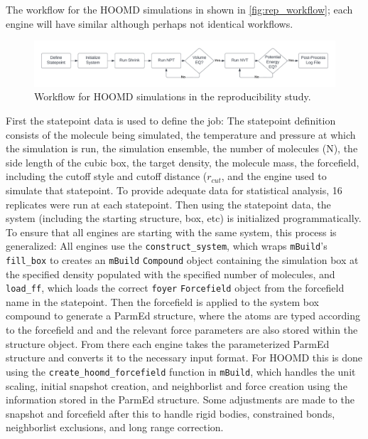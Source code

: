 The workflow for the HOOMD simulations in shown in \autoref{fig:rep_workflow}; each engine will have similar although perhaps not identical workflows.
\begin{figure}[h!]
    \centering
    \includegraphics[width=\linewidth,keepaspectratio]{figures/rep_study/reproducibility_workflow.png}
    \caption{Workflow for HOOMD simulations in the reproducibility study.}\label{fig:rep_workflow}
\end{figure}
First the statepoint data is used to define the job: The statepoint definition consists of the molecule being simulated, the temperature and pressure at which the simulation is run, the simulation ensemble, the number of molecules (N), the side length of the cubic box, the target density, the molecule mass, the forcefield, including the cutoff style and cutoff distance ($r_{cut}$, and the engine used to simulate that statepoint. 
To provide adequate data for statistical analysis, 16 replicates were run at each statepoint.
Then using the statepoint data, the system (including the starting structure, box, etc) is initialized programmatically.
To ensure that all engines are starting with the same system, this process is generalized: All engines use the \lstinline{construct_system}, which wraps \texttt{mBuild}'s \lstinline{fill_box} to creates an \texttt{mBuild} \lstinline{Compound} object containing the simulation box at the specified density populated with the specified number of molecules, and \lstinline{load_ff}, which loads the correct \texttt{foyer} \lstinline{Forcefield} object from the forcefield name in the statepoint. 
Then the forcefield is applied to the system box compound to generate a ParmEd structure\cite{Shirts2017}, where the atoms are typed according to the forcefield and and the relevant force parameters are also stored within the structure object. 
From there each engine takes the parameterized ParmEd structure and converts it to the necessary input format. 
For HOOMD this is done using the \lstinline{create_hoomd_forcefield} function in \texttt{mBuild}, which handles the unit scaling, initial snapshot creation, and neighborlist and force creation using the information stored in the ParmEd structure. 
Some adjustments are made to the snapshot and forcefield after this to handle rigid bodies, constrained bonds, neighborlist exclusions, and long range correction. 
